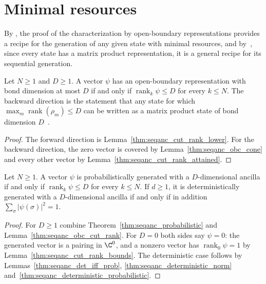 \section{Minimal resources}

By \cite[Section~5.1]{PerezGarcia2007Matrix}, the proof of the
characterization by open-boundary representations provides a recipe for the
generation of any given state with minimal resources, and
by~\cite{Schoen2005Sequential}, since every state has a matrix product
representation, it is a general recipe for its sequential generation.

\begin{lemma}
    \label{thm:seqanc_obc_cut_rank}
    \leanok
    Let $N\ge 1$ and $D\ge 1$. A vector $\psi$ has an open-boundary
    representation with bond dimension at most $D$ if and only if
    $\operatorname{rank}_k\psi\le D$ for every $k\le N$. The backward
    direction is the statement that any state for which
    $\max_m\operatorname{rank}(\rho_m)\le D$ can be written as a matrix
    product state of bond dimension $D$~\cite[Section~3.1]{PerezGarcia2007Matrix}.
\end{lemma}
\begin{proof}
    \leanok
    The forward direction is Lemma~\ref{thm:seqanc_cut_rank_lower}. For the
    backward direction, the zero vector is covered by
    Lemma~\ref{thm:seqanc_obc_cone} and every other vector by
    Lemma~\ref{thm:seqanc_cut_rank_attained}.
\end{proof}

\begin{lemma}
    \label{thm:seqanc_generated_cut_rank}
    \leanok
    Let $N\ge 1$. A vector $\psi$ is probabilistically generated with a
    $D$-dimensional ancilla if and only if $\operatorname{rank}_k\psi\le D$
    for every $k\le N$. If $d\ge 1$, it is deterministically generated with a
    $D$-dimensional ancilla if and only if in addition
    $\sum_\sigma|\psi(\sigma)|^2=1$.
\end{lemma}
\begin{proof}
    \leanok
    For $D\ge 1$ combine Theorem~\ref{thm:seqanc_probabilistic}
    and Lemma~\ref{thm:seqanc_obc_cut_rank}. For $D=0$ both sides say $\psi=0$: the
    generated vector is a pairing in $\C^0$, and a nonzero vector has
    $\operatorname{rank}_0\psi=1$ by Lemma~\ref{thm:seqanc_cut_rank_bounds}.
    The deterministic case follows by
    Lemmas~\ref{thm:seqanc_det_iff_prob},
    \ref{thm:seqanc_deterministic_norm}
    and~\ref{thm:seqanc_deterministic_probabilistic}.
\end{proof}

